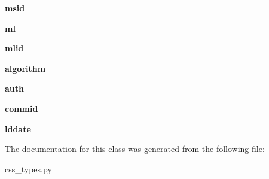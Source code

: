 \begin{DoxyCompactItemize}
\item 
\hypertarget{classcss__types_1_1origin30_a2b0df4082f3b59251f8768fb5cf4d324}{}{\bfseries msid}\label{classcss__types_1_1origin30_a2b0df4082f3b59251f8768fb5cf4d324}

\item 
\hypertarget{classcss__types_1_1origin30_a30c315ed0b81c1efa59f4bb3c1b07c04}{}{\bfseries ml}\label{classcss__types_1_1origin30_a30c315ed0b81c1efa59f4bb3c1b07c04}

\item 
\hypertarget{classcss__types_1_1origin30_aa0b4d2ef0a4c4cd76b67ca0c36f47f48}{}{\bfseries mlid}\label{classcss__types_1_1origin30_aa0b4d2ef0a4c4cd76b67ca0c36f47f48}

\item 
\hypertarget{classcss__types_1_1origin30_a4f669f34c1fc74759cd8f673108a1691}{}{\bfseries algorithm}\label{classcss__types_1_1origin30_a4f669f34c1fc74759cd8f673108a1691}

\item 
\hypertarget{classcss__types_1_1origin30_a633db1773b02412e245d4ea268ac331b}{}{\bfseries auth}\label{classcss__types_1_1origin30_a633db1773b02412e245d4ea268ac331b}

\item 
\hypertarget{classcss__types_1_1origin30_aec6466539a9d5d4a4ab281787b89da47}{}{\bfseries commid}\label{classcss__types_1_1origin30_aec6466539a9d5d4a4ab281787b89da47}

\item 
\hypertarget{classcss__types_1_1origin30_a91130b65d82fc34f438bd5a6fe961bcb}{}{\bfseries lddate}\label{classcss__types_1_1origin30_a91130b65d82fc34f438bd5a6fe961bcb}

\end{DoxyCompactItemize}


The documentation for this class was generated from the following file\+:\begin{DoxyCompactItemize}
\item 
css\+\_\+types.\+py\end{DoxyCompactItemize}
